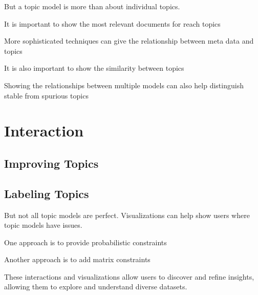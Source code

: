 But a topic model is more than about individual topics.

It is important to show the most relevant documents for reach
topics~\citep{chaney-12}

More sophisticated techniques can give the relationship between meta
data and topics~\citep{gardner-10,eistenstein-14}

It is also important to show the similarity between
topics~\citep{chuang-12}

Showing the relationships between multiple models can also help
distinguish stable from spurious topics~\citep{chuang-15}

\section{Interaction}

\subsection{Improving Topics}

\subsection{Labeling Topics}
\label{sec:viz:label}

But not all topic models are perfect.  Visualizations can help show
users where topic models have issues.

One approach is to provide probabilistic constraints~\citep{hu-14:itm}

Another approach is to add matrix constraints~\citep{choo-13}

These interactions and visualizations allow users to discover and
refine insights, allowing them to explore and understand diverse
datasets.